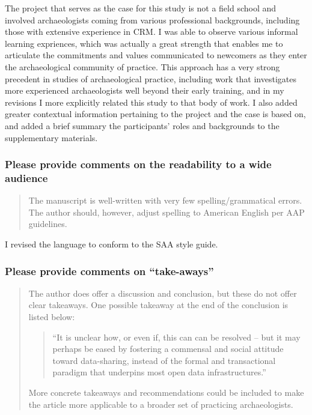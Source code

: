 \documentclass[
]{article}
\begin{document}
The project that serves as the case for this study is not a field school
and involved archaeologists coming from various professional
backgrounds, including those with extensive experience in CRM. I was
able to observe various informal learning expriences, which was actually
a great strength that enables me to articulate the commitments and
values communicated to newcomers as they enter the archaeological
community of practice. This approach has a very strong precedent in
studies of archaeological practice, including work that investigates
more experienced archaeologists well beyond their early training, and in
my revisions I more explicitly related this study to that body of work.
I also added greater contextual information pertaining to the project
and the case is based on, and added a brief summary the participants'
roles and backgrounds to the supplementary materials.

\subsubsection{Please provide comments on the readability to a wide
audience}\label{please-provide-comments-on-the-readability-to-a-wide-audience}

\begin{quote}
The manuscript is well-written with very few spelling/grammatical
errors. The author should, however, adjust spelling to American English
per AAP guidelines.
\end{quote}

I revised the language to conform to the SAA style guide.

\subsubsection{Please provide comments on
``take-aways''}\label{please-provide-comments-on-take-aways-1}

\begin{quote}
The author does offer a discussion and conclusion, but these do not
offer clear takeaways. One possible takeaway at the end of the
conclusion is listed below:

\begin{quote}
``It is unclear how, or even if, this can can be resolved -- but it may
perhaps be eased by fostering a commensal and social attitude toward
data-sharing, instead of the formal and transactional paradigm that
underpins most open data infrastructures.''
\end{quote}

More concrete takeaways and recommendations could be included to make
the article more applicable to a broader set of practicing
archaeologists.
\end{quote}
\end{document}
